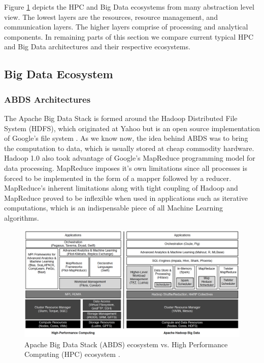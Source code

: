 \documentclass[runningheads,a4paper]{llncs}
\begin{document}
Figure \ref*{fig:bigdata_hpc_ecosystem} depicts the HPC and Big Data ecosystems from many abstraction level view. The lowest layers are the resources, resource management, and communication layers. The higher layers comprise of processing and analytical components. In remaining parts of this section we compare current typical HPC and Big Data architectures and their respective ecosystems.
\newpage
\subsection{Big Data Ecosystem}
\lipsum[1]


\subsubsection*{ABDS Architectures}
The Apache Big Data Stack is formed around the Hadoop Distributed File System (HDFS), which originated at Yahoo but is an open source implementation of Google's file system \cite{shvachko2010hadoop} \cite{ghemawat2003google}. As we know now, the idea behind ABDS was to bring the computation to data, which is usually stored at cheap commodity hardware. Hadoop 1.0 also took advantage of Google's MapReduce programming model for data processing. MapReduce imposes it's own limitations since all processes is forced to be implemented in the form of a mapper followed by a reducer. MapReduce's inherent limitations along with tight coupling of Hadoop and MapReduce proved to be inflexible when used in applications such as iterative computations, which is an indispensable piece of all Machine Learning algorithms.\\

\begin{figure}
	\includegraphics[scale=0.33]{./images/Ecosystems.png}
	\centering
	\caption{Apache Big Data Stack (ABDS) ecosystem vs. High Performance Computing (HPC) ecosystem \cite{Jha2014}.}
	\label{fig:bigdata_hpc_ecosystem}
\end{figure}
\end{document}
